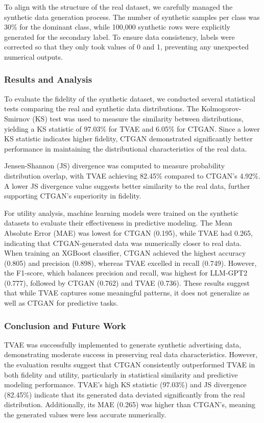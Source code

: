 \documentclass{article}
\begin{document}
To align with the structure of the real dataset, we carefully managed the synthetic data generation process. The number of synthetic samples per class was 30\% for the dominant class, while 100,000 synthetic rows were explicitly generated for the secondary label. To ensure data consistency, labels were corrected so that they only took values of 0 and 1, preventing any unexpected numerical outputs.

\subsubsection[short]{Results and Analysis}

To evaluate the fidelity of the synthetic dataset, we conducted several statistical tests comparing the real and synthetic data distributions. The Kolmogorov-Smirnov (KS) test was used to measure the similarity between distributions, yielding a KS statistic of 97.03\% for TVAE and 6.05\% for CTGAN. Since a lower KS statistic indicates higher fidelity, CTGAN demonstrated significantly better performance in maintaining the distributional characteristics of the real data.

Jensen-Shannon (JS) divergence was computed to measure probability distribution overlap, with TVAE achieving 82.45\% compared to CTGAN’s 4.92\%. A lower JS divergence value suggests better similarity to the real data, further supporting CTGAN’s superiority in fidelity.

For utility analysis, machine learning models were trained on the synthetic datasets to evaluate their effectiveness in predictive modeling. The Mean Absolute Error (MAE) was lowest for CTGAN (0.195), while TVAE had 0.265, indicating that CTGAN-generated data was numerically closer to real data. When training an XGBoost classifier, CTGAN achieved the highest accuracy (0.805) and precision (0.898), whereas TVAE excelled in recall (0.749). However, the F1-score, which balances precision and recall, was highest for LLM-GPT2 (0.777), followed by CTGAN (0.762) and TVAE (0.736). These results suggest that while TVAE captures some meaningful patterns, it does not generalize as well as CTGAN for predictive tasks.

\subsubsection[short]{Conclusion and Future Work}

TVAE was successfully implemented to generate synthetic advertising data, demonstrating moderate success in preserving real data characteristics. However, the evaluation results suggest that CTGAN consistently outperformed TVAE in both fidelity and utility, particularly in statistical similarity and predictive modeling performance. TVAE’s high KS statistic (97.03\%) and JS divergence (82.45\%) indicate that its generated data deviated significantly from the real distribution. Additionally, its MAE (0.265) was higher than CTGAN’s, meaning the generated values were less accurate numerically.
\end{document}
